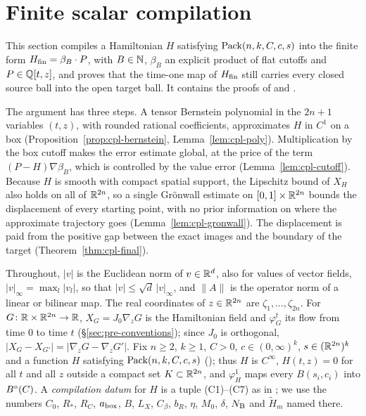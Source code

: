 \section{Finite scalar compilation}\label{sec:cpl}

This section compiles a Hamiltonian $H$ satisfying $\mathrm{Pack}(n,k,C,c,s)$ into the finite form $H_{\mathrm{fin}}=\beta_B\cdot P$,
with $B\in\mathbb{N}$, $\beta_B$ an explicit product of flat cutoffs and $P\in\mathbb{Q}[t,z]$, and proves that the time-one map of
$H_{\mathrm{fin}}$ still carries every closed source ball into the open target ball. It contains the proofs of
 and .

The argument has three steps. A tensor Bernstein polynomial in the $2n+1$ variables $(t,z)$, with rounded
rational coefficients, approximates $H$ in $C^1$ on a box (Proposition~\ref{prop:cpl-bernstein},
Lemma~\ref{lem:cpl-poly}). Multiplication by the box cutoff makes the error estimate global, at the price of the
term $(P-H)\nabla\beta_B$, which is controlled by the value error (Lemma~\ref{lem:cpl-cutoff}). Because $H$ is
smooth with compact spatial support, the Lipschitz bound of $X_H$ also holds on all of $\mathbb{R}^{2n}$, so a single
Gr\"onwall estimate on $[0,1]\times\mathbb{R}^{2n}$ bounds the displacement of every starting point, with no prior
information on where the approximate trajectory goes (Lemma~\ref{lem:cpl-gronwall}). The displacement is paid
from the positive gap between the exact images and the boundary of the target (Theorem~\ref{thm:cpl-final}).

Throughout, $|v|$ is the Euclidean norm of $v\in\mathbb{R}^d$, also for values of vector fields, $|v|_\infty=\max_l|v_l|$,
so that $|v|\le\sqrt d\,|v|_\infty$, and $\|A\|$ is the operator norm of a linear or bilinear map. The real
coordinates of $z\in\mathbb{R}^{2n}$ are $\zeta_1,\dots,\zeta_{2n}$. For $G\colon\mathbb{R}\times\mathbb{R}^{2n}\to\mathbb{R}$, $X_G=J_0\nabla_zG$ is
the Hamiltonian field and $\varphi^t_G$ its flow from time $0$ to time $t$ (\S\ref{sec:pre-conventions}); since
$J_0$ is orthogonal, $|X_G-X_{G'}|=|\nabla_zG-\nabla_zG'|$. Fix $n\ge2$, $k\ge1$, $C>0$, $c\in(0,\infty)^k$,
$s\in(\mathbb{R}^{2n})^k$ and a function $H$ satisfying $\mathrm{Pack}(n,k,C,c,s)$ (); thus $H$ is
$C^\infty$, $H(t,z)=0$ for all $t$ and all $z$ outside a compact set $K\subset\mathbb{R}^{2n}$, and $\varphi^1_H$ maps every
$B(s_i,c_i)$ into $B^{\circ}(C)$. A \emph{compilation datum} for $H$ is a tuple (C1)--(C7) as in ; we
use the numbers $C_0$, $R_*$, $R_C$, $a_{\rm box}$, $B$, $L_X$, $C_\beta$, $b_R$, $\eta$, $M_0$, $\delta$, $N_{\rm B}$ and
$\tilde H_m$ named there.

